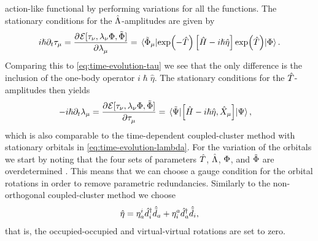             action-like functional by performing variations for all the
            functions.
            The stationary conditions for the $\hat{\Lambda}$-amplitudes are given by
            \begin{align}
                i\hslash\partial_t \clustamp_{\mu}
                = \dpd{\mathcal{E}[
                    \clustamp_{\nu}, \clustlamp_{\nu}
                    \slat, \tilde{\slat}
                ]}{\clustlamp_{\mu}}
                =
                \mel*{\tilde{\slat}_{\mu}}{
                    \exp(-\clust)\brak{
                        \hamil
                        - i\hslash\hat{\eta}
                    }\exp(\clust)
                }{\slat}.
            \end{align}
            Comparing this to \autoref{eq:time-evolution-tau} we see that the
            only difference is the inclusion of the one-body operator
            $i\hslash\hat{\eta}$.
            The stationary conditions for the $\hat{T}$-amplitudes then yields
            \begin{align}
                -i\hslash\partial_t\clustlamp_{\mu}
                &=
                \dpd{\mathcal{E}[
                    \clustamp_{\nu}, \clustlamp_{\nu}
                    \slat, \tilde{\slat}
                ]}{\clustamp_{\mu}}
                =
                \mel*{\tilde{\Psi}}{
                    \com{
                        \hamil
                        - i\hslash\hat{\eta}
                    }{
                        \hat{X}_{\mu}
                    }
                }{\Psi},
            \end{align}
            which is also comparable to the time-dependent coupled-cluster
            method with stationary orbitals in
            \autoref{eq:time-evolution-lambda}.
            For the variation of the orbitals we start by noting that the four
            sets of parameters $\hat{T}$, $\hat{\Lambda}$, $\Phi$, and $\tilde{\Phi}$
            are overdetermined \cite{kvaal2012ab}.
            This means that we can choose a gauge condition for the orbital
            rotations in order to remove parametric redundancies.
            Similarly to the non-orthogonal coupled-cluster method we choose
            \begin{align}
                \hat{\eta}
                = \eta^{i}_{a}\hat{d}^{\dagger}_{i}\hat{\tilde{d}}_{a}
                + \eta^{a}_{i}\hat{d}^{\dagger}_{a}\hat{\tilde{d}}_{i},
            \end{align}
            that is, the occupied-occupied and virtual-virtual rotations are set
            to zero.

